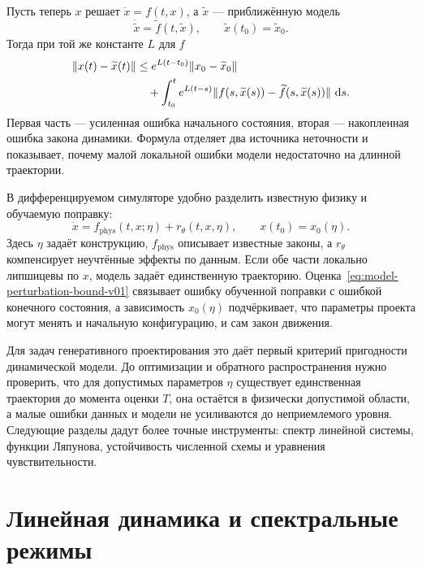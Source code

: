 Пусть теперь $x$ решает $\dot x=f(t,x)$, а $\widetilde x$ --- приближённую модель
\[
\dot{\widetilde x}=\widetilde f(t,\widetilde x),
\qquad
\widetilde x(t_0)=\widetilde x_0.
\]
Тогда при той же константе $L$ для $f$
\begin{equation}
\label{eq:model-perturbation-bound-v01}
\begin{aligned}
\lVert x(t)-\widetilde x(t)\rVert
&\leq
 e^{L(t-t_0)}\lVert x_0-\widetilde x_0\rVert\\
&\quad+
\int_{t_0}^{t}
 e^{L(t-s)}
 \lVert f(s,\widetilde x(s))-\widetilde f(s,\widetilde x(s))\rVert
\,\mathop{}\!\mathrm{d} s.
\end{aligned}
\end{equation}
Первая часть --- усиленная ошибка начального состояния, вторая --- накопленная ошибка закона динамики. Формула отделяет два источника неточности и показывает, почему малой локальной ошибки модели недостаточно на длинной траектории.

\begin{application}
В дифференцируемом симуляторе удобно разделить известную физику и обучаемую поправку:
\begin{equation}
\label{eq:hybrid-neural-ode-v01}
\dot x
=
f_{\mathrm{phys}}(t,x;\eta)
+r_\theta(t,x,\eta),
\qquad
x(t_0)=x_0(\eta).
\end{equation}
Здесь $\eta$ задаёт конструкцию, $f_{\mathrm{phys}}$ описывает известные законы, а $r_\theta$ компенсирует неучтённые эффекты по данным. Если обе части локально липшицевы по $x$, модель задаёт единственную траекторию. Оценка~\eqref{eq:model-perturbation-bound-v01} связывает ошибку обученной поправки с ошибкой конечного состояния, а зависимость $x_0(\eta)$ подчёркивает, что параметры проекта могут менять и начальную конфигурацию, и сам закон движения.
\end{application}

Для задач генеративного проектирования это даёт первый критерий пригодности динамической модели. До оптимизации и обратного распространения нужно проверить, что для допустимых параметров $\eta$ существует единственная траектория до момента оценки $T$, она остаётся в физически допустимой области, а малые ошибки данных и модели не усиливаются до неприемлемого уровня. Следующие разделы дадут более точные инструменты: спектр линейной системы, функции Ляпунова, устойчивость численной схемы и уравнения чувствительности.

\section{Линейная динамика и спектральные режимы}
\label{sec:linear-dynamics-spectral-modes}

